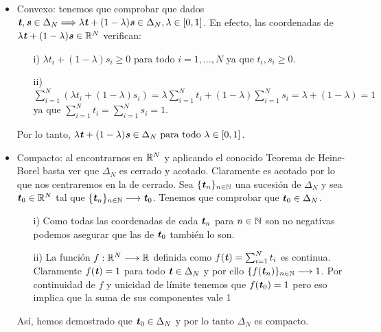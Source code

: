 	\begin{itemize}
		\item  Convexo: tenemos que comprobar que dados $ \textbf{\emph{t}}, \textbf{\emph{s}} \in \Delta_N  \Longrightarrow \lambda\textbf{\emph{t}} + (1-\lambda)\textbf{\emph{s}} \in \Delta_N, \lambda \in \lbrack 0,1 \rbrack$. En efecto, las coordenadas de $ \lambda\textbf{\emph{t}} + (1-\lambda)\textbf{\emph{s}} \in \mathbb{R}^N $ verifican:
		\begin{itemize}
			\item [i) ] $ \lambda t_i + (1-\lambda)s_i \geq 0 $ para todo $ i = 1,..., N $ ya que $ t_i, s_i \geq 0 $.
			\item [ii) ] $ \sum_{i=1}^{N} (\lambda t_i + (1-\lambda)s_i) =   \lambda \sum_{i=1}^{N} t_i + (1-\lambda)\sum_{i=1}^{N} s_i = \lambda + (1 - \lambda) = 1$ ya que $ \sum_{i=1}^{N} t_i = \sum_{i=1}^{N} s_i = 1  $.
		\end{itemize}
	
		Por lo tanto, $ \lambda\textbf{\emph{t}} + (1-\lambda)\textbf{\emph{s}} \in \Delta_N \text{ para todo }\lambda \in \lbrack 0,1 \rbrack $.
		
		\item Compacto: al encontrarnos en $ \mathbb{R}^N $ y aplicando el conocido Teorema de Heine-Borel basta ver que $ \Delta_N $ es cerrado y acotado. Claramente es acotado por lo que nos centraremos en la de cerrado. Sea $ \lbrace \textbf{\emph{t}}_n \rbrace_{ n \in \mathbb{N}} $ una sucesión de $ \Delta_N $ y sea $ \textbf{\emph{t}}_0 \in \mathbb{R}^N $ tal que $ \lbrace \textbf{\emph{t}}_n \rbrace_{ n \in \mathbb{N}} \longrightarrow \textbf{\emph{t}}_0 $. Tenemos que comprobar que $ \textbf{\emph{t}}_0 \in \Delta_N $. 
		\begin{itemize}
		\item[i) ] Como todas las coordenadas de cada $ \textbf{\emph{t}}_n $ para $ n \in \mathbb{N} $ son no negativas podemos asegurar que las de $ \textbf{\emph{t}}_0 $ también lo son.
		\item[ii) ] La función $ f: \mathbb{R}^N \longrightarrow \mathbb{R} $ definida como $ f(\textbf{\emph{t}}) =  \sum_{i=1}^{N} t_i $ es continua. Claramente $ f(\textbf{\emph{t}}) = 1 $ para todo $ \textbf{\emph{t}} \in \Delta_N $ y por ello $ \lbrace f(\textbf{\emph{t}}_n) \rbrace_{ n \in \mathbb{N}} \longrightarrow 1$. Por continuidad de $ f $ y unicidad de límite tenemos que $ f(\textbf{\emph{t}}_0) = 1 $ pero eso implica que la suma de sus componentes vale 1
		\end{itemize} 
	
		Así, hemos demostrado que $ \textbf{\emph{t}}_0 \in \Delta_N $ y por lo tanto $ \Delta_N $ es compacto. 
	\end{itemize}

